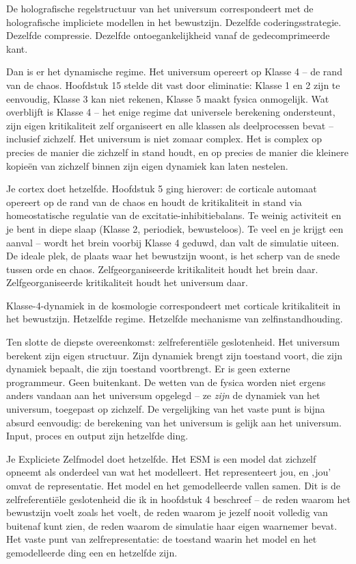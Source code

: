 \documentclass[11pt, twoside, openright]{book}
\begin{document}
De holografische regelstructuur van het universum correspondeert met de holografische impliciete modellen in het bewustzijn. Dezelfde coderingsstrategie. Dezelfde compressie. Dezelfde ontoegankelijkheid vanaf de gedecomprimeerde kant.

Dan is er het dynamische regime. Het universum opereert op Klasse 4 -- de rand van de chaos. Hoofdstuk 15 stelde dit vast door eliminatie: Klasse 1 en 2 zijn te eenvoudig, Klasse 3 kan niet rekenen, Klasse 5 maakt fysica onmogelijk. Wat overblijft is Klasse 4 -- het enige regime dat universele berekening ondersteunt, zijn eigen kritikaliteit zelf organiseert en alle klassen als deelprocessen bevat -- inclusief zichzelf. Het universum is niet zomaar complex. Het is complex op precies de manier die zichzelf in stand houdt, en op precies de manier die kleinere kopieën van zichzelf binnen zijn eigen dynamiek kan laten nestelen.

Je cortex doet hetzelfde. Hoofdstuk 5 ging hierover: de corticale automaat opereert op de rand van de chaos en houdt de kritikaliteit in stand via homeostatische regulatie van de excitatie-inhibitiebalans. Te weinig activiteit en je bent in diepe slaap (Klasse 2, periodiek, bewusteloos). Te veel en je krijgt een aanval -- wordt het brein voorbij Klasse 4 geduwd, dan valt de simulatie uiteen. De ideale plek, de plaats waar het bewustzijn woont, is het scherp van de snede tussen orde en chaos. Zelfgeorganiseerde kritikaliteit houdt het brein daar. Zelfgeorganiseerde kritikaliteit houdt het universum daar.

Klasse-4-dynamiek in de kosmologie correspondeert met corticale kritikaliteit in het bewustzijn. Hetzelfde regime. Hetzelfde mechanisme van zelfinstandhouding.

Ten slotte de diepste overeenkomst: zelfreferentiële geslotenheid. Het universum berekent zijn eigen structuur. Zijn dynamiek brengt zijn toestand voort, die zijn dynamiek bepaalt, die zijn toestand voortbrengt. Er is geen externe programmeur. Geen buitenkant. De wetten van de fysica worden niet ergens anders vandaan aan het universum opgelegd -- ze \textit{zijn} de dynamiek van het universum, toegepast op zichzelf. De vergelijking van het vaste punt is bijna absurd eenvoudig: de berekening van het universum is gelijk aan het universum. Input, proces en output zijn hetzelfde ding.

Je Expliciete Zelfmodel doet hetzelfde. Het ESM is een model dat zichzelf opneemt als onderdeel van wat het modelleert. Het representeert jou, en ‚jou’ omvat de representatie. Het model en het gemodelleerde vallen samen. Dit is de zelfreferentiële geslotenheid die ik in hoofdstuk 4 beschreef -- de reden waarom het bewustzijn voelt zoals het voelt, de reden waarom je jezelf nooit volledig van buitenaf kunt zien, de reden waarom de simulatie haar eigen waarnemer bevat. Het vaste punt van zelfrepresentatie: de toestand waarin het model en het gemodelleerde ding een en hetzelfde zijn.
\end{document}

